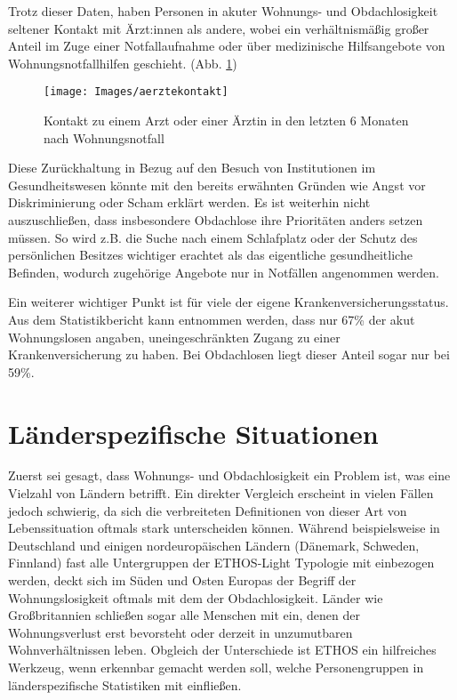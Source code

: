 Trotz dieser Daten, haben Personen in akuter Wohnungs- und Obdachlosigkeit seltener Kontakt mit Ärzt:innen als andere, wobei ein verhältnismäßig großer Anteil im Zuge einer Notfallaufnahme oder über medizinische Hilfsangebote von Wohnungsnotfallhilfen geschieht. (Abb. \ref{fig:aerztekontakt})

\begin{figure}[h]
	\centering
	\texttt{[image: Images/aerztekontakt]}
	\caption[Ärztekontakt nach Wohnungsnotfall]{Kontakt zu einem Arzt oder einer Ärztin in den letzten 6 Monaten nach Wohnungsnotfall \citep[S. 20]{BAGW.2022}}
	\label{fig:aerztekontakt}
\end{figure}

Diese Zurückhaltung in Bezug auf den Besuch von Institutionen im Gesundheitswesen könnte mit den bereits erwähnten Gründen wie Angst vor Diskriminierung oder Scham \citep{Kaduszkiewicz.2017} erklärt werden. Es ist weiterhin nicht auszuschließen, dass insbesondere Obdachlose ihre Prioritäten anders setzen müssen. So wird z.B. die Suche nach einem Schlafplatz oder der Schutz des persönlichen Besitzes wichtiger erachtet als das eigentliche gesundheitliche Befinden, wodurch zugehörige Angebote nur in Notfällen angenommen werden.

Ein weiterer wichtiger Punkt ist für viele der eigene Krankenversicherungsstatus. Aus dem Statistikbericht kann entnommen werden, dass nur 67\% der akut Wohnungslosen angaben, uneingeschränkten Zugang zu einer Krankenversicherung zu haben. Bei Obdachlosen liegt dieser Anteil sogar nur bei 59\%.

\section{Länderspezifische Situationen}\label{sec:countryspec}

Zuerst sei gesagt, dass Wohnungs- und Obdachlosigkeit ein Problem ist, was eine Vielzahl von Ländern betrifft. Ein direkter Vergleich erscheint in vielen Fällen jedoch schwierig, da sich die verbreiteten Definitionen von dieser Art von Lebenssituation oftmals stark unterscheiden können. Während beispielsweise in Deutschland und einigen nordeuropäischen Ländern (Dänemark, Schweden, Finnland) fast alle Untergruppen der \ac{ETHOS}-Light Typologie mit einbezogen werden, deckt sich im Süden und Osten Europas der Begriff der Wohnungslosigkeit oftmals mit dem der Obdachlosigkeit. Länder wie Großbritannien schließen sogar alle Menschen mit ein, denen der Wohnungsverlust erst bevorsteht oder derzeit in unzumutbaren Wohnverhältnissen leben. Obgleich der Unterschiede ist \ac{ETHOS} ein hilfreiches Werkzeug, wenn erkennbar gemacht werden soll, welche Personengruppen in länderspezifische Statistiken mit einfließen. \citep{Busch-Geertsema.2018}

